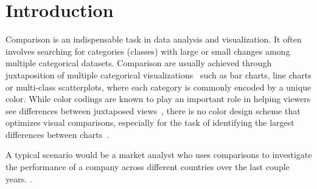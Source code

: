 \section{Introduction}
Comparison is an indispensable task in data analysis and visualization. It often involves searching for categories (classes) with large or small changes among multiple categorical datasets.
Comparison are usually achieved through juxtaposition of multiple categorical visualizations~\cite{Gleicher18,LYi21} such as bar charts, line charts or multi-class scatterplots, where each category is commonly encoded by a unique color.
While color codings are known to play an important role in helping viewers see differences between juxtaposed views~\cite{Tominski08,Albers11,Gleicher18}, there is no color design scheme that optimizes visual comparisons, especially for the task of identifying the largest differences between charts~\cite{Ondov19}. %

A typical scenario would be  a market analyst who uses comparisons to
investigate the performance of a company across different countries over the last couple years.
.


